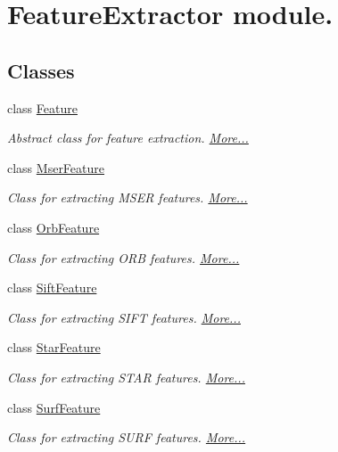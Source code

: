 \hypertarget{group___feature_extractor}{\section{Feature\-Extractor module.}
\label{group___feature_extractor}
}
\subsection*{Classes}
\begin{DoxyCompactItemize}
\item 
class \hyperlink{group___feature_extractor_class_feature}{Feature}
\begin{DoxyCompactList}\small\item\em Abstract class for feature extraction.  \hyperlink{group___feature_extractor_class_feature}{More...}\end{DoxyCompactList}\item 
class \hyperlink{group___feature_extractor_class_mser_feature}{Mser\-Feature}
\begin{DoxyCompactList}\small\item\em Class for extracting M\-S\-E\-R features.  \hyperlink{group___feature_extractor_class_mser_feature}{More...}\end{DoxyCompactList}\item 
class \hyperlink{group___feature_extractor_class_orb_feature}{Orb\-Feature}
\begin{DoxyCompactList}\small\item\em Class for extracting O\-R\-B features.  \hyperlink{group___feature_extractor_class_orb_feature}{More...}\end{DoxyCompactList}\item 
class \hyperlink{group___feature_extractor_class_sift_feature}{Sift\-Feature}
\begin{DoxyCompactList}\small\item\em Class for extracting S\-I\-F\-T features.  \hyperlink{group___feature_extractor_class_sift_feature}{More...}\end{DoxyCompactList}\item 
class \hyperlink{group___feature_extractor_class_star_feature}{Star\-Feature}
\begin{DoxyCompactList}\small\item\em Class for extracting S\-T\-A\-R features.  \hyperlink{group___feature_extractor_class_star_feature}{More...}\end{DoxyCompactList}\item 
class \hyperlink{group___feature_extractor_class_surf_feature}{Surf\-Feature}
\begin{DoxyCompactList}\small\item\em Class for extracting S\-U\-R\-F features.  \hyperlink{group___feature_extractor_class_surf_feature}{More...}\end{DoxyCompactList}\end{DoxyCompactItemize}


